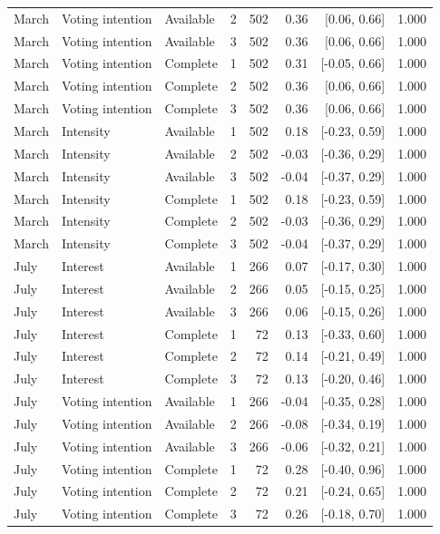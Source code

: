 \begin{longtable}{lllrrrrr}
March & Voting intention & Available & 2 & 502 & 0.36 & [0.06, 0.66] & 1.000 \\
March & Voting intention & Available & 3 & 502 & 0.36 & [0.06, 0.66] & 1.000 \\
March & Voting intention & Complete & 1 & 502 & 0.31 & [-0.05, 0.66] & 1.000 \\
March & Voting intention & Complete & 2 & 502 & 0.36 & [0.06, 0.66] & 1.000 \\
March & Voting intention & Complete & 3 & 502 & 0.36 & [0.06, 0.66] & 1.000 \\
March & Intensity & Available & 1 & 502 & 0.18 & [-0.23, 0.59] & 1.000 \\
March & Intensity & Available & 2 & 502 & -0.03 & [-0.36, 0.29] & 1.000 \\
March & Intensity & Available & 3 & 502 & -0.04 & [-0.37, 0.29] & 1.000 \\
March & Intensity & Complete & 1 & 502 & 0.18 & [-0.23, 0.59] & 1.000 \\
March & Intensity & Complete & 2 & 502 & -0.03 & [-0.36, 0.29] & 1.000 \\
March & Intensity & Complete & 3 & 502 & -0.04 & [-0.37, 0.29] & 1.000 \\
July & Interest & Available & 1 & 266 & 0.07 & [-0.17, 0.30] & 1.000 \\
July & Interest & Available & 2 & 266 & 0.05 & [-0.15, 0.25] & 1.000 \\
July & Interest & Available & 3 & 266 & 0.06 & [-0.15, 0.26] & 1.000 \\
July & Interest & Complete & 1 &  72 & 0.13 & [-0.33, 0.60] & 1.000 \\
July & Interest & Complete & 2 &  72 & 0.14 & [-0.21, 0.49] & 1.000 \\
July & Interest & Complete & 3 &  72 & 0.13 & [-0.20, 0.46] & 1.000 \\
July & Voting intention & Available & 1 & 266 & -0.04 & [-0.35, 0.28] & 1.000 \\
July & Voting intention & Available & 2 & 266 & -0.08 & [-0.34, 0.19] & 1.000 \\
July & Voting intention & Available & 3 & 266 & -0.06 & [-0.32, 0.21] & 1.000 \\
July & Voting intention & Complete & 1 &  72 & 0.28 & [-0.40, 0.96] & 1.000 \\
July & Voting intention & Complete & 2 &  72 & 0.21 & [-0.24, 0.65] & 1.000 \\
July & Voting intention & Complete & 3 &  72 & 0.26 & [-0.18, 0.70] & 1.000 \\

\end{longtable}
